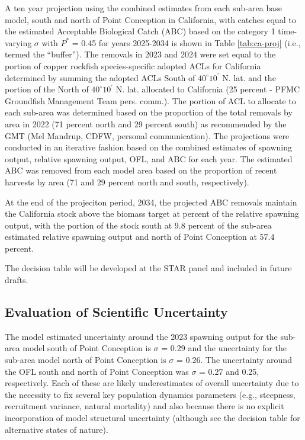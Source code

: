 \documentclass[11pt,
  english,
  letterpaper,
]{article}
\begin{document}
A ten year projection using the combined estimates from each sub-area base model, south and north of Point Conception in California, with catches equal to the estimated Acceptable Biological Catch (ABC) based on the category 1 time-varying \(\sigma\) with \(P^*\) = 0.45 for years 2025-2034 is shown in Table \ref{tab:ca-proj} (i.e., termed the ``buffer''). The removals in 2023 and 2024 were set equal to the portion of copper rockfish species-specific adopted ACLs for California determined by summing the adopted ACLs South of $40^\circ 10^\prime$ N. lat. and the portion of the North of $40^\circ 10^\prime$ N. lat. allocated to California (25 percent - PFMC Groundfish Management Team pers. comm.). The portion of ACL to allocate to each sub-area was determined based on the proportion of the total removals by area in 2022 (71 percent north and 29 percent south) as recommended by the GMT (Mel Mandrup, CDFW, personal communication). The projections were conducted in an iterative fashion based on the combined estimates of spawning output, relative spawning output, OFL, and ABC for each year. The estimated ABC was removed from each model area based on the proportion of recent harvests by area (71 and 29 percent north and south, respectively).

At the end of the projeciton period, 2034, the projected ABC removals maintain the California stock above the biomass target at percent of the relative spawning output, with the portion of the stock south at 9.8 percent of the sub-area estimated relative spawning output and north of Point Conception at 57.4 percent.

The decision table will be developed at the STAR panel and included in future drafts.

\hypertarget{evaluation-of-scientific-uncertainty}{%
\subsection{Evaluation of Scientific Uncertainty}\label{evaluation-of-scientific-uncertainty}}

The model estimated uncertainty around the 2023 spawning output for the sub-area model south of Point Conception is \(\sigma\) = 0.29 and the uncertainty for the sub-area model north of Point Conception is \(\sigma\) = 0.26. The uncertainty around the OFL south and north of Point Conception was \(\sigma\) = 0.27 and 0.25, respectively. Each of these are likely underestimates of overall uncertainty due to the necessity to fix several key population dynamics parameters (e.g., steepness, recruitment variance, natural mortality) and also because there is no explicit incorporation of model structural uncertainty (although see the decision table for alternative states of nature).
\end{document}
